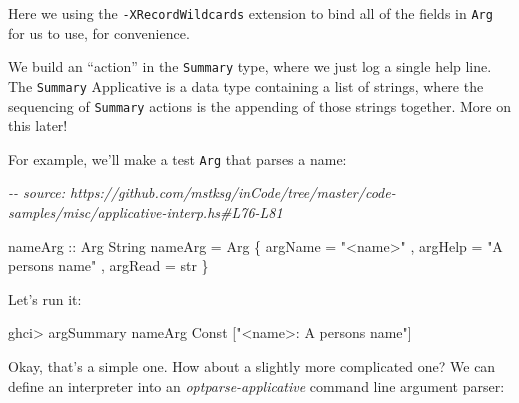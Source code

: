 \documentclass[]{article}
\newenvironment{Shaded}{}{}
\newcommand{\CommentTok}[1]{\textcolor[rgb]{0.38,0.63,0.69}{\textit{#1}}}
\newcommand{\DataTypeTok}[1]{\textcolor[rgb]{0.56,0.13,0.00}{#1}}
\newcommand{\NormalTok}[1]{#1}
\newcommand{\OperatorTok}[1]{\textcolor[rgb]{0.40,0.40,0.40}{#1}}
\newcommand{\OtherTok}[1]{\textcolor[rgb]{0.00,0.44,0.13}{#1}}
\newcommand{\StringTok}[1]{\textcolor[rgb]{0.25,0.44,0.63}{#1}}
\begin{document}
Here we using the \texttt{-XRecordWildcards} extension to bind all of the fields
in \texttt{Arg} for us to use, for convenience.

We build an ``action'' in the \texttt{Summary} type, where we just log a single
help line. The \texttt{Summary} Applicative is a data type containing a list of
strings, where the sequencing of \texttt{Summary} actions is the appending of
those strings together. More on this later!

For example, we'll make a test \texttt{Arg} that parses a name:

\begin{Shaded}
\begin{Highlighting}[]
\CommentTok{{-}{-} source: https://github.com/mstksg/inCode/tree/master/code{-}samples/misc/applicative{-}interp.hs\#L76{-}L81}

\OtherTok{nameArg ::} \DataTypeTok{Arg} \DataTypeTok{String}
\NormalTok{nameArg }\OtherTok{=} \DataTypeTok{Arg}
\NormalTok{    \{ argName }\OtherTok{=} \StringTok{"\textless{}name\textgreater{}"}
\NormalTok{    , argHelp }\OtherTok{=} \StringTok{"A person\textquotesingle{}s name"}
\NormalTok{    , argRead }\OtherTok{=}\NormalTok{ str}
\NormalTok{    \}}
\end{Highlighting}
\end{Shaded}

Let's run it:

\begin{Shaded}
\begin{Highlighting}[]
\NormalTok{ghci}\OperatorTok{\textgreater{}}\NormalTok{ argSummary nameArg}
\DataTypeTok{Const}\NormalTok{ [}\StringTok{"\textless{}name\textgreater{}: A person\textquotesingle{}s name"}\NormalTok{]}
\end{Highlighting}
\end{Shaded}

Okay, that's a simple one. How about a slightly more complicated one? We can
define an interpreter into an \emph{optparse-applicative} command line argument
parser:

\begin{Shaded}
\end{Shaded}
\end{document}
